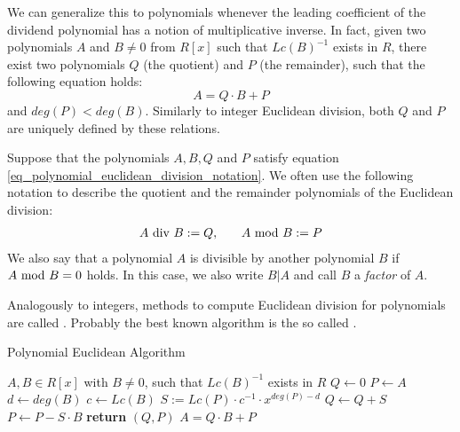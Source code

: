 We can generalize this to polynomials whenever the leading coefficient of the dividend polynomial has a notion of multiplicative inverse. In fact, given two polynomials $A$ and $B\neq 0$ from $R[x]$ such that $Lc(B)^{-1}$ exists in $R$, there exist two polynomials $Q$ (the quotient) and $P$ (the remainder), such that the following equation holds:
\begin{equation}
\label{eq_polynomial_euclidean_division_notation}
A = Q\cdot B + P
\end{equation}
and $deg(P) < deg(B)$. Similarly to integer Euclidean division, both $Q$ and $P$ are uniquely defined by these relations. 
\begin{notation}
\label{notation_polynomial_euclidean_division_notation}
Suppose that the polynomials $ A, B, Q $ and $ P $ satisfy equation \ref{eq_polynomial_euclidean_division_notation}. We often use the following notation to describe the quotient and the remainder polynomials of the Euclidean division:
\begin{equation}
\label{def_polynomial_division_and_modulus}
\begin{array}{lcr}
A \text{ div } B: = Q, & & A \text{ mod } B: = P 
\end{array}
\end{equation}
We also say that a polynomial $ A $ is divisible by another polynomial $ B $ if $ A \text{ mod } B = 0 $ holds. In this case, we also write $ B | A $ and call $B$ a \textit{factor} of $A$.
\end{notation}
Analogously to integers, methods to compute Euclidean division for polynomials are called . Probably the best known algorithm is the so called  . 
\begin{algorithm}\caption{Polynomial Euclidean Algorithm}
\label{alg_polynom_euclid_alg}
\begin{algorithmic}[0]
\Require $A,B \in R[x]$ with $B\neq 0$, such that $Lc(B)^{-1}$ exists in $R$
\State $Q \gets 0$
\State $P \gets A$
\State $d \gets deg(B)$
\State $c \gets Lc(B)$
\State  $S := Lc(P)\cdot c^{-1}\cdot x^{deg(P)-d}$
\State $Q \gets Q + S$
\State $P \gets P - S\cdot B$
\EndWhile
\State \textbf{return} $(Q, P)$ 
\EndProcedure
\Ensure $ A=  Q \cdot B + P$
\end{algorithmic}
\end{algorithm}

